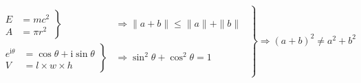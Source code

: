 \documentclass{article}
\begin{document}
	\begin{equation*}
		\left.
		\begin{aligned}
			\begin{aligned}
				\left.
				\begin{aligned}
					E &= mc^2 \\
					A &= \pi r^2
				\end{aligned}
				\right\}&\Rightarrow \| a + b \| \le \|a\| + \|b\| \\
				\left.
				\begin{aligned}
					e^{\mathrm{i} \theta} &= \cos\theta + \mathrm{i}\sin\theta\\
					V &= l \times w \times h
				\end{aligned}
				\right\}&\Rightarrow\sin^2\theta + \cos^2\theta = 1
			\end{aligned}
		\end{aligned}
		\right\}\Rightarrow (a + b)^2 \neq a^2 + b^2
	\end{equation*}	
\end{document}
